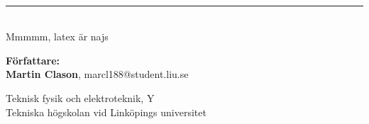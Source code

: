 
%
\begin{titlepage}
	\thispagestyle{titlestyle}
	\vspace*{2cm}
    \begin{center}
    \begin{minipage}{.7\textwidth}
	 \\
  	[0.1cm]
	\linethickness{0.5mm}
    \rule{\textwidth}{3pt} \\
	[0.35cm]
	\textsf{\fontsize{16}{0}\selectfont Mmmmm, latex är najs}
  	\vspace{2 cm}
  	\begin{center}
     {\Large{}
    }
    \vspace{2cm}
  	{\Large\bfseries{}
    }
    \smallskip
    {\large\sffamily{
    	\today\\}
    }
	\end{center}
  	\vspace{6 cm}
  	\begin{raggedright}
    	{\Large\textsf{\bfseries Författare:}\\}
    	\smallskip
    	{\textsf{\large{\bfseries Martin Clason}, marcl188@student.liu.se}}
  	\end{raggedright}
	\end{minipage}
	\vfill
	{\large
		Teknisk fysik och elektroteknik, Y\\
        Tekniska högskolan vid Linköpings universitet
	}
	\end{center}
\end{titlepage}
\clearpage
